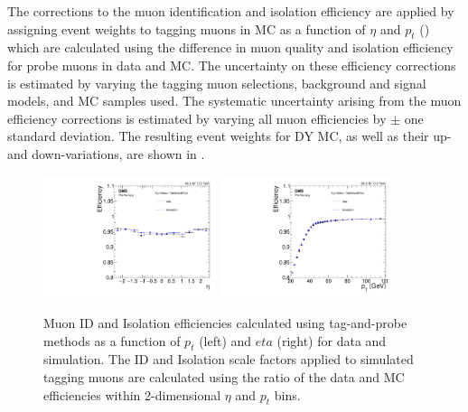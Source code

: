 The corrections to the muon identification and isolation efficiency are applied by assigning event weights to tagging muons in MC as a function of $\eta$ and $p_t$ () which are calculated using the difference in muon quality and isolation efficiency for probe muons in data and MC. 
The uncertainty on these efficiency corrections is estimated by varying the tagging muon selections, background and signal models, and MC samples used. 
The systematic uncertainty arising from the muon efficiency corrections is estimated by varying all muon efficiencies by $\pm$ one standard deviation.
The resulting event weights for DY MC, as well as their up- and down-variations, are shown in .

\begin{figure}[htbp]
	\centering
	\includegraphics[width=0.45\textwidth]{figures/muonEtaEff.pdf}
        \hspace{0.01\textwidth}
        \includegraphics[width=0.45\textwidth]{figures/muonPtEff.pdf}
	\caption[Muon ID and Isolation Efficiencies]{Muon ID and Isolation efficiencies calculated using tag-and-probe methods as a function of $p_t$ (left) and $eta$ (right) for data and simulation. The ID and Isolation scale factors applied to simulated tagging muons are calculated using the ratio of the data and MC efficiencies within 2-dimensional $\eta$ and $p_t$ bins.}
        \label{fig:muIdIsoEff}
\end{figure}

